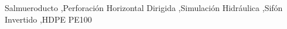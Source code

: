 \begin{frontmatter}
	\begin{keyword}
		Salmueroducto \sep Perforación Horizontal Dirigida \sep Simulación Hidráulica \sep Sifón Invertido \sep HDPE PE100
	\end{keyword}

\end{frontmatter}

\pagestyle{corporativo}
\thispagestyle{corporativo}
